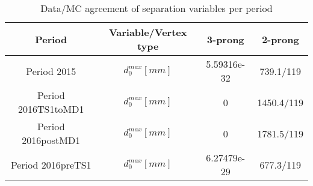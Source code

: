 \documentclass{article}
\begin{document}
\begin{longtable}{c|c|c|c}
\caption{\label{tab:sepVarsandSepPeriods}Data/MC agreement of separation variables per period}\\
Period & Variable/Vertex type & 3-prong & 2-prong\\
\hline
 Period 2015 & $d_{0}^{max} [mm]$ & 5.59316e-32 & 739.1/119\\
\hline
 Period 2016TS1toMD1 & $d_{0}^{max} [mm]$ & 0 & 1450.4/119\\
\hline
 Period 2016postMD1 & $d_{0}^{max} [mm]$ & 0 & 1781.5/119\\
\hline
 Period 2016preTS1 & $d_{0}^{max} [mm]$ & 6.27479e-29 & 677.3/119\\
\hline
\end{longtable}
\end{document}
